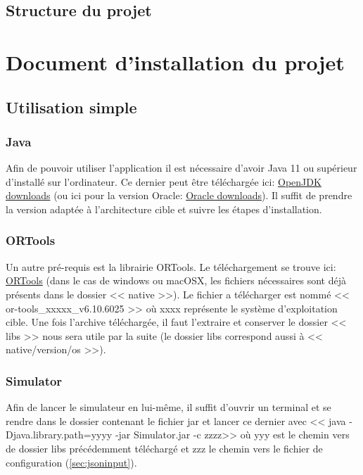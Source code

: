 \documentclass[noposter,final]{polytech/polytech}
\begin{document}
	\section{Structure du projet}
	
\chapter{Document d'installation du projet}
	\section{Utilisation simple}
		\subsection{Java}
			Afin de pouvoir utiliser l'application il est nécessaire d'avoir Java 11 ou supérieur d'installé sur l'ordinateur.
			Ce dernier peut être téléchargée ici: \href{https://jdk.java.net/}{OpenJDK downloads} (ou ici pour la version Oracle: \href{https://www.oracle.com/technetwork/java/javase/downloads/index.html}{Oracle downloads}).
			Il suffit de prendre la version adaptée à l'architecture cible et suivre les étapes d'installation.

		\subsection{ORTools}
			Un autre pré-requis est la librairie ORTools.
			Le téléchargement se trouve ici: \href{https://github.com/google/or-tools/releases/tag/v6.10}{ORTools} (dans le cas de windows ou macOSX, les fichiers nécessaires sont déjà présents dans le dossier << native >>).
			Le fichier a télécharger est nommé << or-tools\_xxxxx\_v6.10.6025 >> où xxxx représente le système d'exploitation cible.
			Une fois l'archive téléchargée, il faut l'extraire et conserver le dossier << libs >> nous sera utile par la suite (le dossier libs correspond aussi à << native/version/os >>).

		\subsection{Simulator}
			Afin de lancer le simulateur en lui-même, il suffit d'ouvrir un terminal et se rendre dans le dossier contenant le fichier jar et lancer ce dernier avec << java -Djava.library.path=yyyy -jar Simulator.jar -c zzzz>> où yyy est le chemin vers de dossier libs précédemment téléchargé et zzz le chemin vers le fichier de configuration (\autoref{sec:jsoninput}).
\end{document}
